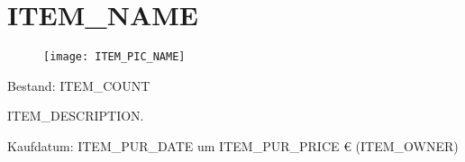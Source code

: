\documentclass[../list/inventory_full.tex]{subfiles}
\begin{document}

\section{ITEM_NAME}

\begin{figure}[h]
  \centering
  \texttt{[image: ITEM\_PIC\_NAME]}
\end{figure}

Bestand: ITEM_COUNT

ITEM_DESCRIPTION.

Kaufdatum: ITEM_PUR_DATE um ITEM_PUR_PRICE € (ITEM_OWNER)

\pagebreak
\end{document}
